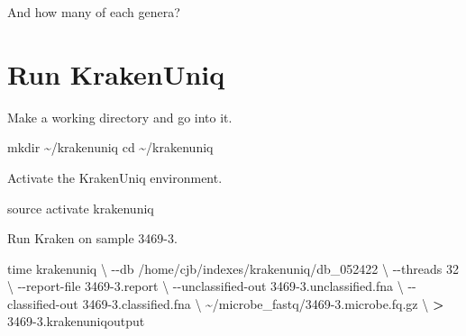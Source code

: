 \documentclass[
]{book}
\newenvironment{Shaded}{\begin{snugshade}}{\end{snugshade}}
\newcommand{\AttributeTok}[1]{\textcolor[rgb]{0.77,0.63,0.00}{#1}}
\newcommand{\BuiltInTok}[1]{#1}
\newcommand{\DataTypeTok}[1]{\textcolor[rgb]{0.13,0.29,0.53}{#1}}
\newcommand{\FunctionTok}[1]{\textcolor[rgb]{0.00,0.00,0.00}{#1}}
\newcommand{\KeywordTok}[1]{\textcolor[rgb]{0.13,0.29,0.53}{\textbf{#1}}}
\newcommand{\NormalTok}[1]{#1}
\newcommand{\OperatorTok}[1]{\textcolor[rgb]{0.81,0.36,0.00}{\textbf{#1}}}
\newcommand{\StringTok}[1]{\textcolor[rgb]{0.31,0.60,0.02}{#1}}
\begin{document}
And how many of each genera?

\begin{Shaded}
\end{Shaded}

\hypertarget{run-krakenuniq}{%
\section{Run KrakenUniq}\label{run-krakenuniq}}

Make a working directory and go into it.

\begin{Shaded}
\begin{Highlighting}[]
\FunctionTok{mkdir}\NormalTok{ \textasciitilde{}/krakenuniq}
\BuiltInTok{cd}\NormalTok{ \textasciitilde{}/krakenuniq}
\end{Highlighting}
\end{Shaded}

Activate the KrakenUniq environment.

\begin{Shaded}
\begin{Highlighting}[]
\BuiltInTok{source}\NormalTok{ activate krakenuniq}
\end{Highlighting}
\end{Shaded}

Run Kraken on sample 3469-3.

\begin{Shaded}
\begin{Highlighting}[]
\BuiltInTok{time}\NormalTok{ krakenuniq }\DataTypeTok{\textbackslash{}}
    \AttributeTok{{-}{-}db}\NormalTok{ /home/cjb/indexes/krakenuniq/db\_052422 }\DataTypeTok{\textbackslash{}}
    \AttributeTok{{-}{-}threads}\NormalTok{ 32 }\DataTypeTok{\textbackslash{}}
    \AttributeTok{{-}{-}report{-}file}\NormalTok{ 3469{-}3.report }\DataTypeTok{\textbackslash{}}
    \AttributeTok{{-}{-}unclassified{-}out}\NormalTok{ 3469{-}3.unclassified.fna }\DataTypeTok{\textbackslash{}}
    \AttributeTok{{-}{-}classified{-}out}\NormalTok{ 3469{-}3.classified.fna }\DataTypeTok{\textbackslash{}}
\NormalTok{    \textasciitilde{}/microbe\_fastq/3469{-}3.microbe.fq.gz }\DataTypeTok{\textbackslash{}}
    \OperatorTok{\textgreater{}}\NormalTok{ 3469{-}3.krakenuniqoutput}
\end{Highlighting}
\end{Shaded}
\end{document}
